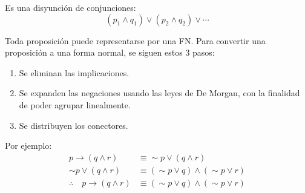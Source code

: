   \begin{definition}[title={Forma Normal Conjuntiva (FNC)}]
  Es una disyunción de conjunciones:
  \begin{equation}
  (p_1 \land q_1) \lor (p_2 \land q_2) \lor \cdots
  \end{equation}
  \end{definition}

  Toda proposición puede representarse por una FN. Para convertir una
  proposición a una forma normal, se siguen estos 3 pasos:

  \begin{enumerate}
  \item Se eliminan las implicaciones.
  \item Se expanden las negaciones usando las leyes de De Morgan, con la
  finalidad de poder agrupar linealmente.
  \item Se distribuyen los conectores.
  \end{enumerate}

  Por ejemplo:
  \begin{align}
  p \to (q \land r) &\equiv \sim p \lor (q \land r) \\
  \sim p \lor (q \land r) &\equiv (\sim p \lor q) \land (\sim p \lor r) \\
  \therefore\quad p \to (q \land r) &\equiv (\sim p \lor q) \land (\sim p \lor r)
  \end{align}